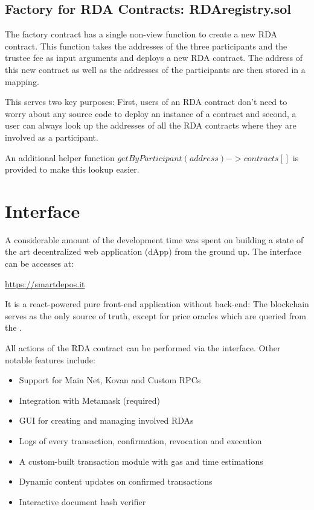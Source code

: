 \documentclass[12pt,a4paper,titlepage,oneside,english]{article}
\begin{document}
\subsection{Factory for RDA Contracts: RDAregistry.sol}
The factory contract has a single non-view function to create a new RDA contract.
This function takes the addresses of the three participants and the trustee fee as input arguments and deploys a new RDA contract. The address of this new contract as well as the addresses of the participants are then stored in a mapping.

This serves two key purposes: First, users of an RDA contract don't need to worry about any source code to deploy an instance of a contract and second, a user can always look up the addresses of all the RDA contracts where they are involved as a participant. 

An additional helper function $getByParticipant(address) -> contracts[]$ is provided to make this lookup easier.



\section{Interface}

A considerable amount of the development time was spent on building a state of the art decentralized web application (dApp) from the ground up. The interface can be accesses at:

\url{https://smartdepos.it}

It is a react-powered pure front-end application without back-end: The blockchain serves as the only source of truth, except for price oracles which are queried from the \cite{Coinbase2020}.

All actions of the RDA contract can be performed via the interface. Other notable features include:

\begin{itemize}
	\item Support for Main Net, Kovan and Custom RPCs
	\item Integration with Metamask (required)
	\item GUI for creating and managing involved RDAs
	\item Logs of every transaction, confirmation, revocation and execution
	\item A custom-built transaction module with gas and time estimations
	\item Dynamic content updates on confirmed transactions
	\item Interactive document hash verifier
\end{itemize}
\end{document}

